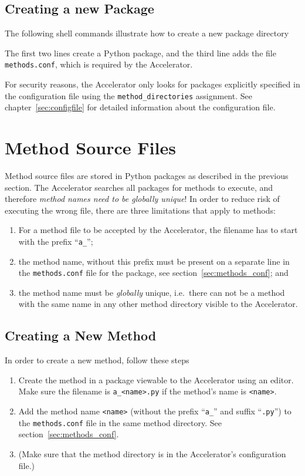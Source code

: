 \subsection{Creating a new Package}
The following shell commands illustrate how to create a new package
directory
\begin{shell}
\end{shell}
The first two lines create a Python package, and the third line adds
the file \texttt{methods.conf}, which is required by the Accelerator.

For security reasons, the Accelerator only looks for packages
explicitly specified in the configuration file using the
\texttt{method_directories} assignment.  See
chapter~\ref{sec:configfile} for detailed information about the
configuration file.



\section{Method Source Files}
Method source files are stored in Python packages as described in the
previous section.  The Accelerator searches all packages for methods
to execute, and therefore \textsl{method names need to be globally
unique}!  In order to reduce risk of executing the wrong file, there
are three limitations that apply to methods:
\begin{enumerate}
\item For a method file to be accepted by the Accelerator, the
  filename has to start with the prefix ``\texttt{a\_}'';
\item the method name, without this prefix must be present on a
  separate line in the \texttt{methods.conf} file for the package, see
  section~\ref{sec:methods_conf}; and
\item the method name must be \emph{globally} unique, i.e.\ there can
  not be a method with the same name in any other method directory
  visible to the Accelerator.
\end{enumerate}


\subsection{Creating a New Method}
In order to create a new method, follow these steps
\begin{enumerate}
\item Create the method in a package viewable to the Accelerator
  using an editor.  Make sure the filename is \texttt{a\_<name>.py} if
  the method's name is \texttt{<name>}.
\item Add the method name \texttt{<name>} (without the prefix ``\texttt{a\_}'' and
  suffix ``\texttt{.py}'') to the \texttt{methods.conf} file in the
  same method directory.  See section~\ref{sec:methods_conf}.
\item (Make sure that the method directory is in the Accelerator's
  configuration file.)
\end{enumerate}


